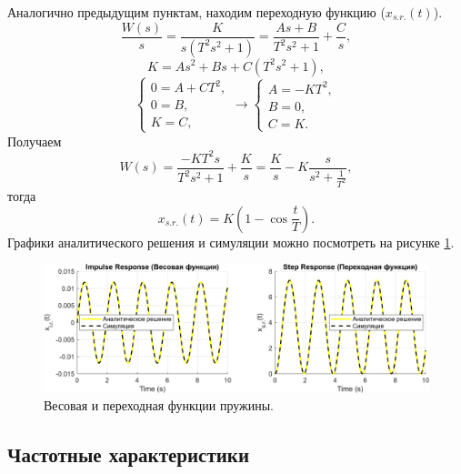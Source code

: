 Аналогично предыдущим пунктам, находим переходную функцию ($x_{s.r.}(t)$).
\begin{equation*}
    \frac{W(s)}{s}=\frac{K}{s(T^2s^2+1)}=\frac{As+B}{T^2s^2+1}+\frac{C}{s},
\end{equation*}
\begin{equation*}
    K=As^2+Bs+C(T^2s^2+1),
\end{equation*}
\begin{equation*}
    \begin{cases}
        0=A+CT^2,\\
        0=B,\\
        K=C,
    \end{cases}\rightarrow
    \begin{cases}
        A=-KT^2,\\
        B=0,\\
        C=K.
    \end{cases}
\end{equation*}
Получаем
\begin{equation*}
    W(s)=\frac{-KT^2s}{T^2s^2+1}+\frac{K}{s}
    =\frac{K}{s}-K\frac{s}{s^2+\frac{1}{T^2}},
\end{equation*}
тогда
\begin{equation*}
    x_{s.r.}(t)=K(1-\cos\frac{t}{T}).
\end{equation*}
Графики аналитического решения и симуляции можно посмотреть на рисунке \ref{fig:task_4_impl_step}.

\begin{figure}[htbp]
    \centering
    \includegraphics[width=1\textwidth]{figs/task_4_impl_step.png}
    \caption{Весовая и переходная функции пружины.}
    \label{fig:task_4_impl_step}
\end{figure}

\subsection{Частотные характеристики}

